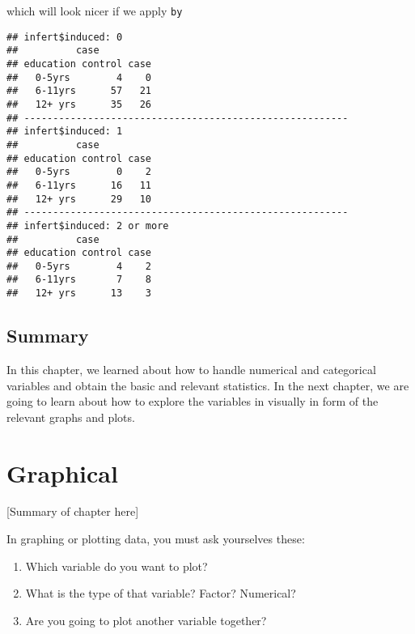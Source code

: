 \documentclass[]{book}
\newenvironment{Shaded}{\begin{snugshade}}{\end{snugshade}}
\newcommand{\KeywordTok}[1]{\textcolor[rgb]{0.13,0.29,0.53}{\textbf{{#1}}}}
\newcommand{\StringTok}[1]{\textcolor[rgb]{0.31,0.60,0.02}{{#1}}}
\newcommand{\NormalTok}[1]{{#1}}
\providecommand{\tightlist}{%
  \setlength{\itemsep}{0pt}\setlength{\parskip}{0pt}}
\theoremstyle{definition}
\theoremstyle{definition}
\theoremstyle{remark}
\begin{document}
which will look nicer if we apply \texttt{by}

\begin{Shaded}
\end{Shaded}

\begin{verbatim}
## infert$induced: 0
##          case
## education control case
##   0-5yrs        4    0
##   6-11yrs      57   21
##   12+ yrs      35   26
## -------------------------------------------------------- 
## infert$induced: 1
##          case
## education control case
##   0-5yrs        0    2
##   6-11yrs      16   11
##   12+ yrs      29   10
## -------------------------------------------------------- 
## infert$induced: 2 or more
##          case
## education control case
##   0-5yrs        4    2
##   6-11yrs       7    8
##   12+ yrs      13    3
\end{verbatim}

\section{Summary}\label{summary}

In this chapter, we learned about how to handle numerical and
categorical variables and obtain the basic and relevant statistics. In
the next chapter, we are going to learn about how to explore the
variables in visually in form of the relevant graphs and plots.

\chapter{Graphical}\label{graphical}

{[}Summary of chapter here{]}

In graphing or plotting data, you must ask yourselves these:

\begin{enumerate}
\def\labelenumi{\arabic{enumi}.}
\tightlist
\item
  Which variable do you want to plot?
\item
  What is the type of that variable? Factor? Numerical?
\item
  Are you going to plot another variable together?
\end{enumerate}
\end{document}
